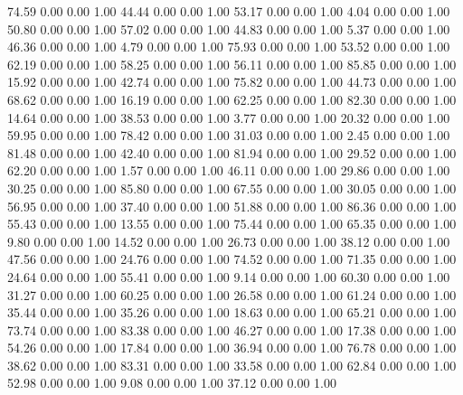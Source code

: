    74.59   0.00   0.00   1.00
   44.44   0.00   0.00   1.00
   53.17   0.00   0.00   1.00
    4.04   0.00   0.00   1.00
   50.80   0.00   0.00   1.00
   57.02   0.00   0.00   1.00
   44.83   0.00   0.00   1.00
    5.37   0.00   0.00   1.00
   46.36   0.00   0.00   1.00
    4.79   0.00   0.00   1.00
   75.93   0.00   0.00   1.00
   53.52   0.00   0.00   1.00
   62.19   0.00   0.00   1.00
   58.25   0.00   0.00   1.00
   56.11   0.00   0.00   1.00
   85.85   0.00   0.00   1.00
   15.92   0.00   0.00   1.00
   42.74   0.00   0.00   1.00
   75.82   0.00   0.00   1.00
   44.73   0.00   0.00   1.00
   68.62   0.00   0.00   1.00
   16.19   0.00   0.00   1.00
   62.25   0.00   0.00   1.00
   82.30   0.00   0.00   1.00
   14.64   0.00   0.00   1.00
   38.53   0.00   0.00   1.00
    3.77   0.00   0.00   1.00
   20.32   0.00   0.00   1.00
   59.95   0.00   0.00   1.00
   78.42   0.00   0.00   1.00
   31.03   0.00   0.00   1.00
    2.45   0.00   0.00   1.00
   81.48   0.00   0.00   1.00
   42.40   0.00   0.00   1.00
   81.94   0.00   0.00   1.00
   29.52   0.00   0.00   1.00
   62.20   0.00   0.00   1.00
    1.57   0.00   0.00   1.00
   46.11   0.00   0.00   1.00
   29.86   0.00   0.00   1.00
   30.25   0.00   0.00   1.00
   85.80   0.00   0.00   1.00
   67.55   0.00   0.00   1.00
   30.05   0.00   0.00   1.00
   56.95   0.00   0.00   1.00
   37.40   0.00   0.00   1.00
   51.88   0.00   0.00   1.00
   86.36   0.00   0.00   1.00
   55.43   0.00   0.00   1.00
   13.55   0.00   0.00   1.00
   75.44   0.00   0.00   1.00
   65.35   0.00   0.00   1.00
    9.80   0.00   0.00   1.00
   14.52   0.00   0.00   1.00
   26.73   0.00   0.00   1.00
   38.12   0.00   0.00   1.00
   47.56   0.00   0.00   1.00
   24.76   0.00   0.00   1.00
   74.52   0.00   0.00   1.00
   71.35   0.00   0.00   1.00
   24.64   0.00   0.00   1.00
   55.41   0.00   0.00   1.00
    9.14   0.00   0.00   1.00
   60.30   0.00   0.00   1.00
   31.27   0.00   0.00   1.00
   60.25   0.00   0.00   1.00
   26.58   0.00   0.00   1.00
   61.24   0.00   0.00   1.00
   35.44   0.00   0.00   1.00
   35.26   0.00   0.00   1.00
   18.63   0.00   0.00   1.00
   65.21   0.00   0.00   1.00
   73.74   0.00   0.00   1.00
   83.38   0.00   0.00   1.00
   46.27   0.00   0.00   1.00
   17.38   0.00   0.00   1.00
   54.26   0.00   0.00   1.00
   17.84   0.00   0.00   1.00
   36.94   0.00   0.00   1.00
   76.78   0.00   0.00   1.00
   38.62   0.00   0.00   1.00
   83.31   0.00   0.00   1.00
   33.58   0.00   0.00   1.00
   62.84   0.00   0.00   1.00
   52.98   0.00   0.00   1.00
    9.08   0.00   0.00   1.00
   37.12   0.00   0.00   1.00
